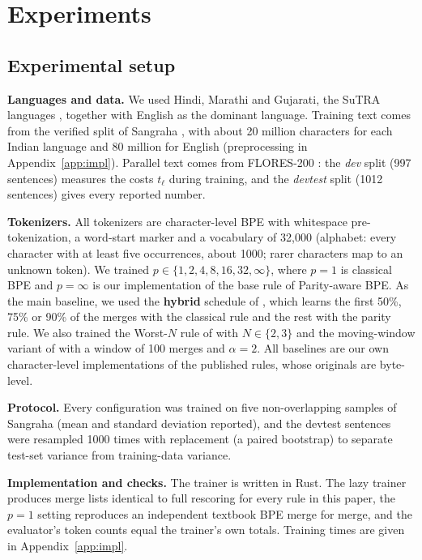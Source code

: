 \section{Experiments}
\label{sec:results}

\subsection{Experimental setup}
\label{sec:setup}

\noindent\textbf{Languages and data.}
We used Hindi, Marathi and Gujarati, the SuTRA languages \citep{rathore2026}, together with
English as the dominant language. Training text comes from the verified split of Sangraha
\citep{khan2024}, with about 20 million characters for each Indian language and 80 million
for English (preprocessing in Appendix~\ref{app:impl}). Parallel text comes from FLORES-200
\citep{nllb2022}: the \emph{dev} split (997 sentences) measures the costs $t_\ell$ during
training, and the \emph{devtest} split (1012 sentences) gives every reported number.

\noindent\textbf{Tokenizers.}
All tokenizers are character-level BPE with whitespace pre-tokenization, a word-start marker
and a vocabulary of 32{,}000 (alphabet: every character with at least five occurrences,
about 1000; rarer characters map to an unknown token). We trained $p\in\{1,2,4,8,16,32,\infty\}$, where $p=1$ is classical BPE and
$p=\infty$ is our implementation of the base rule of Parity-aware BPE. As the main baseline,
we used the \textbf{hybrid} schedule of \citet{foroutan2026}, which learns the first 50\%,
75\% or 90\% of the merges with the classical rule and the rest with the parity rule. We
also trained the Worst-$N$ rule of \citet{kanjirangat2026} with $N\in\{2,3\}$ and the
moving-window variant of \citet{foroutan2026} with a window of 100 merges and $\alpha=2$.
All baselines are our own character-level implementations of the published rules, whose
originals are byte-level.

\noindent\textbf{Protocol.}
Every configuration was trained on five non-overlapping samples of Sangraha (mean and
standard deviation reported), and the devtest sentences were resampled 1000 times with
replacement (a paired bootstrap) to separate test-set variance from training-data variance.

\noindent\textbf{Implementation and checks.}
The trainer is written in Rust. The lazy trainer produces merge lists identical to full
rescoring for every rule in this paper, the $p=1$ setting reproduces an independent textbook
BPE merge for merge, and the evaluator's token counts equal the trainer's own totals.
Training times are given in Appendix~\ref{app:impl}.

